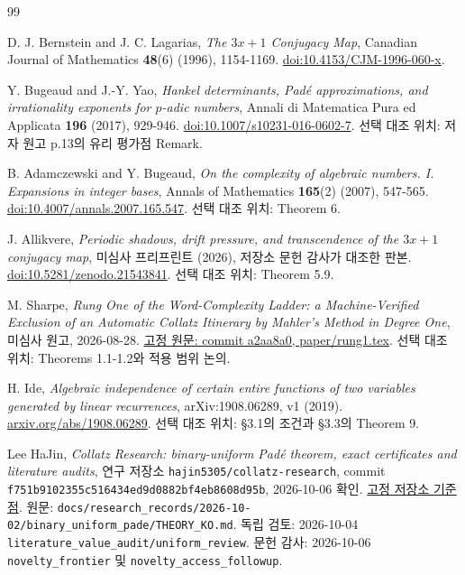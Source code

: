 \documentclass[11pt,a4paper]{article}
\theoremstyle{koreanplain}
\newcommand{\repo}{\texttt{hajin5305/collatz-research}}
\begin{document}
\begin{thebibliography}{99}

D. J. Bernstein and J. C. Lagarias,
\emph{The $3x+1$ Conjugacy Map},
Canadian Journal of Mathematics \textbf{48}(6) (1996), 1154-1169.
\href{https://doi.org/10.4153/CJM-1996-060-x}{doi:10.4153/CJM-1996-060-x}.

Y. Bugeaud and J.-Y. Yao,
\emph{Hankel determinants, Padé approximations, and irrationality exponents for $p$-adic numbers},
Annali di Matematica Pura ed Applicata \textbf{196} (2017), 929-946.
\href{https://doi.org/10.1007/s10231-016-0602-7}{doi:10.1007/s10231-016-0602-7}.
선택 대조 위치: 저자 원고 p.13의 유리 평가점 Remark.

B. Adamczewski and Y. Bugeaud,
\emph{On the complexity of algebraic numbers. I. Expansions in integer bases},
Annals of Mathematics \textbf{165}(2) (2007), 547-565.
\href{https://doi.org/10.4007/annals.2007.165.547}{doi:10.4007/annals.2007.165.547}.
선택 대조 위치: Theorem 6.

J. Allikvere,
\emph{Periodic shadows, drift pressure, and transcendence of the $3x+1$ conjugacy map},
미심사 프리프린트 (2026), 저장소 문헌 감사가 대조한 판본.
\href{https://doi.org/10.5281/zenodo.21543841}{doi:10.5281/zenodo.21543841}.
선택 대조 위치: Theorem 5.9.

M. Sharpe,
\emph{Rung One of the Word-Complexity Ladder: a Machine-Verified Exclusion of an Automatic Collatz Itinerary by Mahler's Method in Degree One},
미심사 원고, 2026-08-28.
\href{https://github.com/msharpe248/collatz/blob/a2aa8a0dda45290fd01c36c253b4b4e14a7e812b/paper/rung1.tex}{고정 원문: commit a2aa8a0, paper/rung1.tex}.
선택 대조 위치: Theorems 1.1-1.2와 적용 범위 논의.

H. Ide,
\emph{Algebraic independence of certain entire functions of two variables generated by linear recurrences},
arXiv:1908.06289, v1 (2019).
\href{https://arxiv.org/abs/1908.06289}{arxiv.org/abs/1908.06289}.
선택 대조 위치: §3.1의 조건과 §3.3의 Theorem 9.

Lee HaJin,
\emph{Collatz Research: binary-uniform Padé theorem, exact certificates and literature audits},
연구 저장소 \repo, commit \texttt{f751b9102355c516434ed9d0882bf4eb8608d95b}, 2026-10-06 확인.
\href{https://github.com/hajin5305/collatz-research/tree/f751b9102355c516434ed9d0882bf4eb8608d95b}{고정 저장소 기준점}.
원문: \texttt{docs/research\_records/2026-10-02/binary\_uniform\_pade/THEORY\_KO.md}.
독립 검토: 2026-10-04 \texttt{literature\_value\_audit/uniform\_review}.
문헌 감사: 2026-10-06 \texttt{novelty\_frontier} 및 \texttt{novelty\_access\_followup}.

\end{thebibliography}
\end{document}
